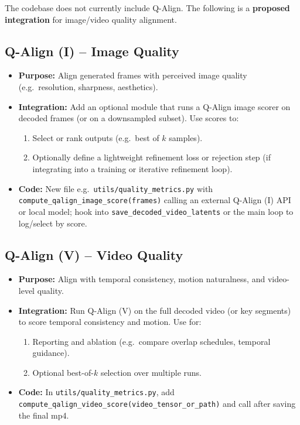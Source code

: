 \documentclass[11pt,a4paper]{article}
\newcommand{\file}[1]{\texttt{#1}}
\newcommand{\fn}[1]{\texttt{#1}}
\begin{document}
The codebase does not currently include Q-Align. The following is a \textbf{proposed integration} for image/video quality alignment.

\subsection{Q-Align (I) -- Image Quality}

\begin{itemize}
    \item \textbf{Purpose:} Align generated frames with perceived image quality (e.g.\ resolution, sharpness, aesthetics).
    \item \textbf{Integration:} Add an optional module that runs a Q-Align image scorer on decoded frames (or on a downsampled subset). Use scores to:
    \begin{enumerate}
        \item Select or rank outputs (e.g.\ best of $k$ samples).
        \item Optionally define a lightweight refinement loss or rejection step (if integrating into a training or iterative refinement loop).
    \end{enumerate}
    \item \textbf{Code:} New file e.g.\ \file{utils/quality\_metrics.py} with \fn{compute\_qalign\_image\_score(frames)} calling an external Q-Align (I) API or local model; hook into \fn{save\_decoded\_video\_latents} or the main loop to log/select by score.
\end{itemize}

\subsection{Q-Align (V) -- Video Quality}

\begin{itemize}
    \item \textbf{Purpose:} Align with temporal consistency, motion naturalness, and video-level quality.
    \item \textbf{Integration:} Run Q-Align (V) on the full decoded video (or key segments) to score temporal consistency and motion. Use for:
    \begin{enumerate}
        \item Reporting and ablation (e.g.\ compare overlap schedules, temporal guidance).
        \item Optional best-of-$k$ selection over multiple runs.
    \end{enumerate}
    \item \textbf{Code:} In \file{utils/quality\_metrics.py}, add \fn{compute\_qalign\_video\_score(video\_tensor\_or\_path)} and call after saving the final mp4.
\end{itemize}
\end{document}

